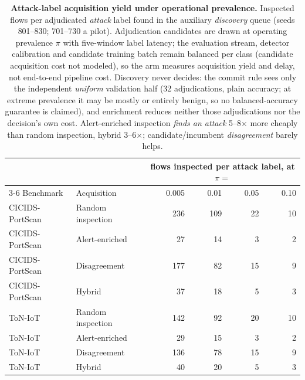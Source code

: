 \begin{table}[t]
\centering
\caption{\textbf{Attack-label acquisition yield under operational prevalence.}
Inspected flows per adjudicated \emph{attack} label found in the auxiliary
\emph{discovery} queue (seeds 801--830; 701--730 a pilot). Adjudication candidates are
drawn at operating prevalence $\pi$ with five-window label latency; the evaluation stream,
detector calibration and candidate training batch remain balanced per class (candidate
acquisition cost not modeled), so the arm measures acquisition yield and delay, not
end-to-end pipeline cost. Discovery never decides: the commit rule sees only the independent
\emph{uniform} validation half (32 adjudications, plain accuracy; at extreme prevalence it
may be mostly or entirely benign, so no balanced-accuracy guarantee is claimed), and
enrichment reduces neither those adjudications nor the decision's own cost. Alert-enriched
inspection \emph{finds an attack} 5--8$\times$ more cheaply than random inspection,
hybrid 3--6$\times$; candidate/incumbent \emph{disagreement} barely helps.}
\label{tab:operational_e2e}
\small
\begin{tabular}{l l r r r r}
\toprule
 & & \multicolumn{4}{c}{flows inspected per attack label, at $\pi =$} \\
\cmidrule(lr){3-6}
Benchmark & Acquisition & 0.005 & 0.01 & 0.05 & 0.10 \\
\midrule
CICIDS-PortScan & Random inspection & 236 & 109 & 22 & 10 \\
CICIDS-PortScan & Alert-enriched & 27 & 14 & 3 & 2 \\
CICIDS-PortScan & Disagreement & 177 & 82 & 15 & 9 \\
CICIDS-PortScan & Hybrid & 37 & 18 & 5 & 3 \\
\addlinespace
ToN-IoT & Random inspection & 142 & 92 & 20 & 10 \\
ToN-IoT & Alert-enriched & 29 & 15 & 3 & 2 \\
ToN-IoT & Disagreement & 136 & 78 & 15 & 9 \\
ToN-IoT & Hybrid & 40 & 20 & 5 & 3 \\
\bottomrule
\end{tabular}
\end{table}
